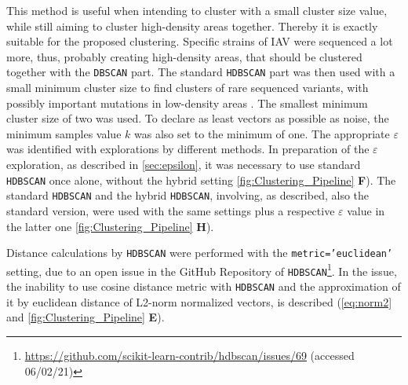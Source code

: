 \vspace{1em}

This method is useful when intending to cluster with a small cluster size value, while still aiming to cluster high-density areas together. Thereby it is exactly suitable for the proposed clustering. Specific strains of \gls{IAV} were sequenced a lot more, thus, probably creating high-density areas, that should be clustered together with the \texttt{DBSCAN} part. The standard \texttt{HDBSCAN} part was then used with a small minimum cluster size to find clusters of rare sequenced variants, with possibly important mutations in low-density areas \autocite{malzer_hybrid_2020}. The smallest minimum cluster size of two was used. To declare as least vectors as possible as noise, the minimum samples value $k$ was also set to the minimum of one. The appropriate $\varepsilon$ was identified with explorations by different methods. In preparation of the $\varepsilon$ exploration, as described in \autoref{sec:epsilon}, it was necessary to use standard \texttt{HDBSCAN} once alone, without the hybrid setting \autoref{fig:Clustering_Pipeline} \textsf{\textbf{F}}). The standard \texttt{HDBSCAN} and the hybrid \texttt{HDBSCAN}, involving, as described, also the standard version, were used with the same settings plus a respective $\varepsilon$ value in the latter one \autoref{fig:Clustering_Pipeline} \textsf{\textbf{H}}).

\vspace{1em}

Distance calculations by \texttt{HDBSCAN} were performed with the \texttt{metric='euclidean'} setting, due to an open issue in the GitHub Repository of \texttt{HDBSCAN}\footnote{\url{https://github.com/scikit-learn-contrib/hdbscan/issues/69} (accessed 06/02/21)}. In the issue, the inability to use cosine distance metric with \texttt{HDBSCAN} and the approximation of it by euclidean distance of L2-norm normalized vectors, is described (\autoref{eq:norm2} and \autoref{fig:Clustering_Pipeline} \textsf{\textbf{E}}). 

